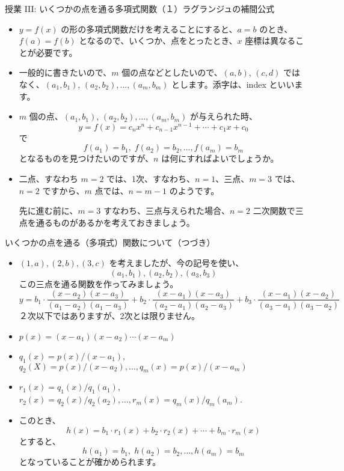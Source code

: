 \documentclass[10pt, dvipdfmx]{beamer}
\begin{document}
\begin{frame}{授業 III: いくつかの点を通る多項式関数（１）}{ラグランジュの補間公式}
\begin{itemize}
\item \(y = f(x)\) の形の多項式関数だけを考えることにすると、\(a = b\) のとき、\(f(a) = f(b)\) となるので、いくつか、点をとったとき、\(x\) 座標は異なることが必要です。
\item 一般的に書きたいので、\(m\) 個の点などとしたいので、\((a,b)\), \((c,d)\) ではなく、\((a_1, b_1)\), \((a_2, b_2), \ldots, (a_m, b_m)\) とします。添字は、index といいます。
\item \(m\) 個の点、\((a_1, b_1)\), \((a_2, b_2), \ldots, (a_m, b_m)\) が与えられた時、
\[ y = f(x) = c_nx^n + c_{n-1}x^{n-1} + \cdots + c_1x+c_0 \] 
で
\[ f(a_1) = b_1, \; f(a_2) = b_2, \ldots, f(a_m) = b_m \] 
となるものを見つけたいのですが、\(n\) は何にすればよいでしょうか。
\item 二点、すなわち \(m=2\) では、1次、すなわち、\(n=1\)、三点、\(m=3\) では、\(n=2\) ですから、\(m\) 点では、\(n = m-1\) のようです。

先に進む前に、\(m=3\) すなわち、三点与えられた場合、\(n=2\) 二次関数で三点を通るものがあるかを考えておきましょう。
\end{itemize}
\end{frame}
\begin{frame}{いくつかの点を通る（多項式）関数について（つづき）}
\begin{itemize}
\item \((1,a), (2,b), (3,c)\) を考えましたが、今の記号を使い、
\[ (a_1, b_1), (a_2, b_2), (a_3, b_3) \] 
この三点を通る関数を作ってみましょう。
\[ y = b_1\cdot \frac{(x-a_2)(x-a_3)}{(a_1-a_2)(a_1-a_3)} + b_2\cdot\frac{(x-a_1)(x-a_3)}{(a_2-a_1)(a_2-a_3)} + b_3\cdot\frac{(x-a_1)(x-a_2)}{(a_3-a_1)(a_3-a_2)} \] 
２次以下ではありますが、2次とは限りません。\par
\item \(p(x) = (x-a_1)(x-a_2)\cdots (x-a_m)\)
\item \(q_1(x) = p(x)/(x-a_1)\), \(q_2(X) = p(x)/(x-a_2), \ldots, q_m(x) = p(x)/(x-a_m)\)
\item \(r_1(x) = q_1(x)/q_1(a_1)\), \(r_2(x) = q_2(x)/q_2(a_2), \ldots, r_m(x) = q_m(x)/q_m(a_m)\).
\item このとき、   
\[ h(x) = b_1\cdot r_1(x) + b_2\cdot r_2(x) + \cdots + b_m\cdot r_m(x) \] 
とすると、 
\[ h(a_1) = b_1, \; h(a_2) = b_2, \ldots, h(a_m) = b_m \] 
となっていることが確かめられます。
\end{itemize}
\end{frame}
\end{document}
